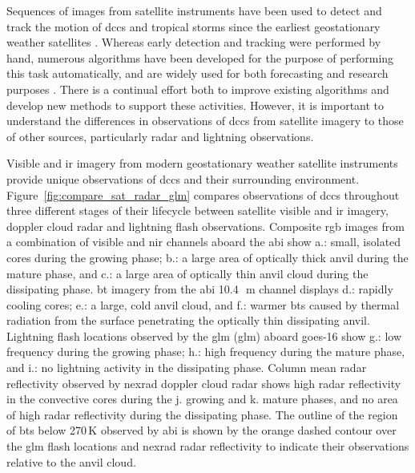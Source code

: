 Sequences of images from satellite instruments have been used to detect and track the motion of \acrshort{dcc}s and tropical storms since the earliest geostationary weather satellites \citep{menzel_cloud_2001}.
Whereas early detection and tracking were performed by hand, numerous algorithms have been developed for the purpose of performing this task automatically, and are widely used for both forecasting and research purposes \citep[e.g.][]{mecikalski_use_2011, senf_characterization_2015, senf_satellite-based_2017, feng_life_2012, feng_spatiotemporal_2019, zinner_cb-tram:_2008}.
There is a continual effort both to improve existing algorithms and develop new methods to support these activities.
However, it is important to understand the differences in observations of \acrshort{dcc}s from satellite imagery to those of other sources, particularly radar and lightning observations.

Visible and \acrshort{ir} imagery from modern geostationary weather satellite instruments provide unique observations of \acrshort{dcc}s and their surrounding environment.
Figure~\ref{fig:compare_sat_radar_glm} compares observations of \acrshort{dcc}s throughout three different stages of their lifecycle between satellite visible and \acrshort{ir} imagery, doppler cloud radar and lightning flash observations.
Composite \acrshort{rgb} images from a combination of visible and \acrshort{nir} channels aboard the \acrshort{abi} show a.: small, isolated cores during the growing phase; b.: a large area of optically thick anvil during the mature phase, and c.: a large area of optically thin anvil cloud during the dissipating phase.
\acrshort{bt} imagery from the \acrshort{abi} 10.4\,\unit{\mu m} channel displays d.: rapidly cooling cores; e.: a large, cold anvil cloud, and f.: warmer \acrshort{bt}s caused by thermal radiation from the surface penetrating the optically thin dissipating anvil. 
Lightning flash locations observed by the \acrshort{glm} (\acrshort{glm}) aboard \acrshort{goes}-16 show g.: low frequency during the growing phase; h.: high frequency during the mature phase, and i.: no lightning activity in the dissipating phase. 
Column mean radar reflectivity observed by \acrshort{nexrad} doppler cloud radar shows high radar reflectivity in the convective cores during the j. growing and k. mature phases, and no area of high radar reflectivity during the dissipating phase. 
The outline of the region of \acrshort{bt}s below 270\,\unit{K} observed by \acrshort{abi} is shown by the orange dashed contour over the \acrshort{glm} flash locations and \acrshort{nexrad} radar reflectivity to indicate their observations relative to the anvil cloud.

